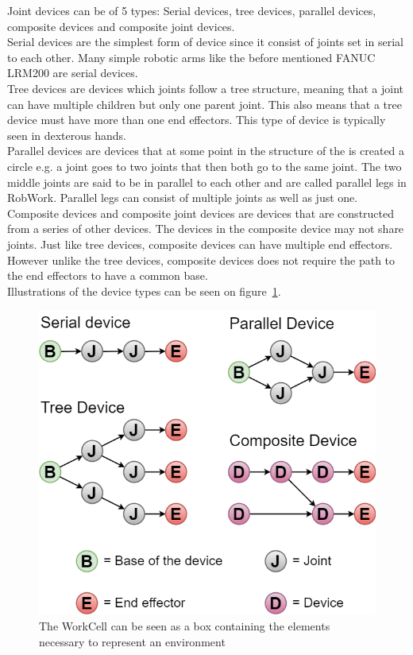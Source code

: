 Joint devices can be of 5 types: Serial devices, tree devices, parallel devices, composite devices and composite joint devices.\\
Serial devices are the simplest form of device since it consist of joints set in serial to each other. Many simple robotic arms like the before mentioned FANUC LRM200 are serial devices.\\
Tree devices are devices which joints follow a tree structure, meaning that a joint can have multiple children but only one parent joint. This also means that a tree device must have more than one end effectors. This type of device is typically seen in dexterous hands.\\
Parallel devices are devices that at some point in the structure of the is created a circle e.g. a joint goes to two joints that then both go to the same joint. The two middle joints are said to be in parallel to each other and are called parallel legs in RobWork. Parallel legs can consist of multiple joints as well as just one.\\
Composite devices and composite joint devices are devices that are constructed from a series of other devices. The devices in the composite device may not share joints. Just like tree devices, composite devices can have multiple end effectors. However unlike the tree devices, composite devices does not require the path to the end effectors to have a common base.\\
Illustrations of the device types can be seen on figure~\ref{fig:DeviceTypes}.

\begin{figure}[h]
	\centering
	\includegraphics[scale=0.55]{Figures/DeviceTypes.png}
	\caption{The WorkCell can be seen as a box containing the elements necessary to represent an environment}
	\label{fig:DeviceTypes}
\end{figure}



